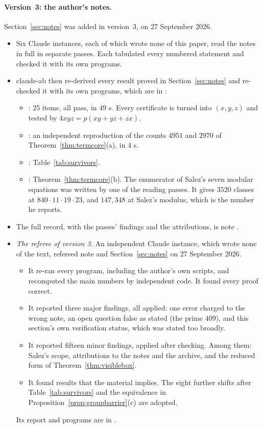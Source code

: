 \paragraph{Version~3: the author's notes.}
Section~\ref{sec:notes} was added in version~3, on 27 September 2026.
\begin{itemize}
\item Six Claude instances, each of which wrote none of this paper, read the notes in full in separate passes. Each tabulated every numbered statement and checked it with its own programs.
\item claude-ab then re-derived every result proved in Section~\ref{sec:notes} and re-checked it with its own programs, which are in :
\begin{itemize}
\item {}: 25 items, all pass, in 49 s. Every certificate is turned into $(x,y,z)$ and tested by $4xyz=p(xy+yz+zx)$.
\item {}: an independent reproduction of the counts $4951$ and $2970$ of Theorem~\ref{thm:termcore}(a), in 4 s.
\item {}: Table~\ref{tab:survivors}.
\item {}: Theorem~\ref{thm:termcore}(b). The enumerator of Salez's seven modular equations was written by one of the reading passes. It gives $3520$ classes at $840\cdot11\cdot19\cdot23$, and $147{,}348$ at Salez's modulus, which is the number he reports.
\end{itemize}
\item The full record, with the passes' findings and the attributions, is note .
\item \emph{The referee of version 3.} An independent Claude instance, which wrote none of the text, refereed note  and Section~\ref{sec:notes} on 27 September 2026.
\begin{itemize}
\item It re-ran every program, including the author's own scripts, and recomputed the main numbers by independent code. It found every proof correct.
\item It reported three major findings, all applied: one error charged to the wrong note, an open question false as stated (the prime $409$), and this section's own verification status, which was stated too broadly.
\item It reported fifteen minor findings, applied after checking. Among them: Salez's scope, attributions to the notes and the archive, and the reduced form of Theorem~\ref{thm:visiblebox}.
\item It found results that the material implies. The eight further shifts after Table~\ref{tab:survivors} and the equivalence in Proposition~\ref{prop:groupbarrier}(c) are adopted.
\end{itemize}
Its report and programs are in .
\end{itemize}

